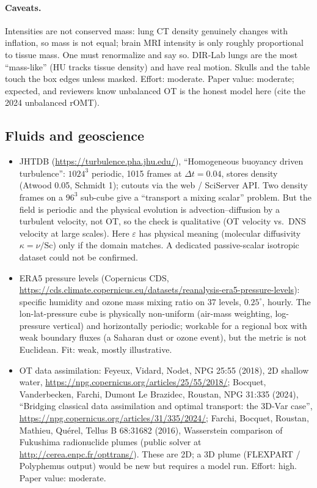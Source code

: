 \documentclass[11pt]{article}
\newcommand{\eps}{\varepsilon}
\begin{document}
\paragraph{Caveats.} Intensities are not conserved mass: lung CT density genuinely
changes with inflation, so mass is not equal; brain MRI intensity is only roughly
proportional to tissue mass. One must renormalize and say so. DIR-Lab lungs are the
most ``mass-like'' (HU tracks tissue density) and have real motion. Skulls and the
table touch the box edges unless masked. Effort: moderate. Paper value: moderate;
expected, and reviewers know unbalanced OT is the honest model here (cite the 2024
unbalanced rOMT).

\subsection{Fluids and geoscience}

\begin{itemize}
  \item JHTDB (\url{https://turbulence.pha.jhu.edu/}), ``Homogeneous buoyancy driven
        turbulence'': $1024^3$ periodic, 1015 frames at $\Delta t=0.04$, stores
        density (Atwood 0.05, Schmidt 1); cutouts via the web / SciServer API. Two
        density frames on a $96^3$ sub-cube give a ``transport a mixing scalar''
        problem. But the field is periodic and the physical evolution is
        advection--diffusion by a turbulent velocity, not OT, so the check is
        qualitative (OT velocity vs.\ DNS velocity at large scales). Here $\eps$ has
        physical meaning (molecular diffusivity $\kappa=\nu/\mathrm{Sc}$) only if the
        domain matches. A dedicated passive-scalar isotropic dataset could not be
        confirmed.
  \item ERA5 pressure levels (Copernicus CDS,
        \url{https://cds.climate.copernicus.eu/datasets/reanalysis-era5-pressure-levels}):
        specific humidity and ozone mass mixing ratio on 37 levels, $0.25^\circ$,
        hourly. The lon-lat-pressure cube is physically non-uniform (air-mass
        weighting, log-pressure vertical) and horizontally periodic; workable for a
        regional box with weak boundary fluxes (a Saharan dust or ozone event), but
        the metric is not Euclidean. Fit: weak, mostly illustrative.
  \item OT data assimilation: Feyeux, Vidard, Nodet, NPG 25:55 (2018), 2D shallow
        water, \url{https://npg.copernicus.org/articles/25/55/2018/}; Bocquet,
        Vanderbecken, Farchi, Dumont Le Brazidec, Roustan, NPG 31:335 (2024),
        ``Bridging classical data assimilation and optimal transport: the 3D-Var
        case'', \url{https://npg.copernicus.org/articles/31/335/2024/}; Farchi,
        Bocquet, Roustan, Mathieu, Qu\'erel, Tellus B 68:31682 (2016), Wasserstein
        comparison of Fukushima radionuclide plumes (public solver at
        \url{http://cerea.enpc.fr/opttrans/}). These are 2D; a 3D plume (FLEXPART /
        Polyphemus output) would be new but requires a model run. Effort: high.
        Paper value: moderate.
\end{itemize}
\end{document}
